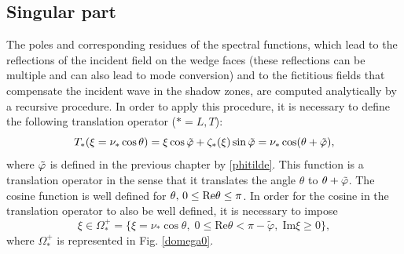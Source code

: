 \subsection{Singular part}
\label{C3:singpart}
The poles and corresponding residues of the spectral functions, which lead to the reflections of the incident field on the wedge faces (these reflections can be multiple and can also lead to mode conversion) and to the fictitious fields that compensate the incident wave in the shadow zones, are computed analytically by a recursive procedure. In order to apply this procedure, it is necessary to define the following translation operator ($*=L,T$):
\begin{equation}
T_*(\xi=\nu_*\cos\theta)=\xi \cos \tilde{\varphi}+\zeta_*(\xi)\sin\tilde{\varphi}=\nu_*\cos(\theta+\tilde{\varphi}),
\end{equation}
where $\tilde{\varphi}$ is defined in the previous chapter by \eqref{phitilde}. 
This function is a translation operator in the sense that it translates the angle $\theta$ to $\theta+\tilde{\varphi}$. The cosine function is well defined for $\theta, \, 0\leq \rm Re \theta \leq \pi$. In order for the cosine in the translation operator to also be well defined, it is necessary to impose
\begin{equation}
\xi \in \Omega_*^+= \{ \xi=\nu_* \cos \theta, \; 0 \leq \mbox{Re} \theta < \pi-\tilde{\varphi}, \; \mbox{Im}\xi\geq0 \},
\label{defOmega0}
\end{equation}
where $\Omega_*^+$ is represented in Fig. \ref{domega0}.

